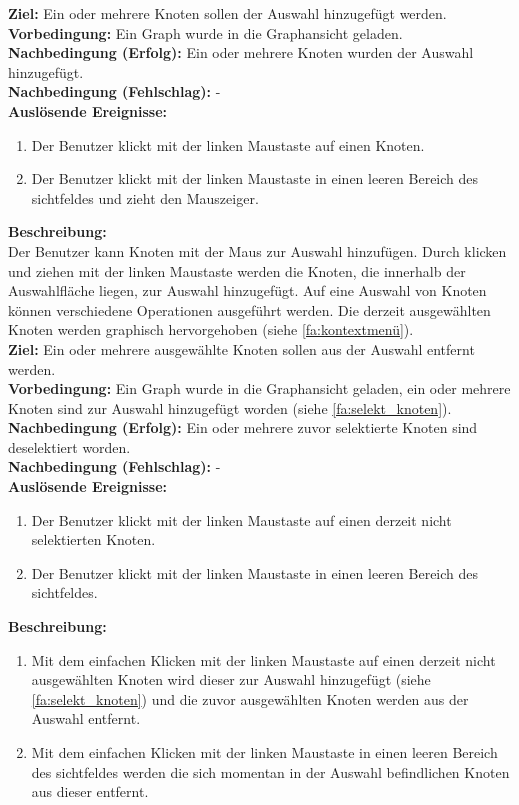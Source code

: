 \label{fa:selekt_knoten}
\textbf{Ziel:} Ein oder mehrere Knoten sollen der Auswahl hinzugefügt werden.\\
\textbf{Vorbedingung:} Ein Graph wurde in die Graphansicht geladen.\\
\textbf{Nachbedingung (Erfolg):} Ein oder mehrere Knoten wurden der Auswahl hinzugefügt.\\
\textbf{Nachbedingung (Fehlschlag):} -\\
\textbf{Auslösende Ereignisse:}
\begin{enumerate}[nolistsep, label=(\alph*)]
  \item Der Benutzer klickt mit der linken Maustaste auf einen Knoten.
  \item Der Benutzer klickt mit der linken Maustaste in einen leeren Bereich des \gls{sichtfeld}es und zieht den Mauszeiger.
\end{enumerate}
\textbf{Beschreibung:}\\
Der Benutzer kann Knoten mit der Maus zur Auswahl hinzufügen. Durch klicken und ziehen mit der linken Maustaste werden die Knoten, die innerhalb der Auswahlfläche liegen, zur Auswahl hinzugefügt.
Auf eine Auswahl von Knoten können verschiedene Operationen ausgeführt werden.
Die derzeit ausgewählten Knoten werden graphisch hervorgehoben (siehe \ref{fa:kontextmenü}).\\

\label{fa:deselekt_knoten}
\textbf{Ziel:} Ein oder mehrere ausgewählte Knoten sollen aus der Auswahl entfernt werden.\\
\textbf{Vorbedingung:} Ein Graph wurde in die Graphansicht geladen, ein oder mehrere Knoten sind zur Auswahl hinzugefügt worden (siehe \ref{fa:selekt_knoten}).\\
\textbf{Nachbedingung (Erfolg):} Ein oder mehrere zuvor selektierte Knoten sind deselektiert worden.\\
\textbf{Nachbedingung (Fehlschlag):} -\\
\textbf{Auslösende Ereignisse:}
\begin{enumerate}[nolistsep, label=(\alph*)]
	\item Der Benutzer klickt mit der linken Maustaste auf einen derzeit nicht selektierten Knoten.
	\item Der Benutzer klickt mit der linken Maustaste in einen leeren Bereich des \gls{sichtfeld}es.
\end{enumerate}
\textbf{Beschreibung:}\\
\begin{enumerate}[nolistsep, label=(\alph*)]
	\item Mit dem einfachen Klicken mit der linken Maustaste auf einen derzeit nicht ausgewählten Knoten wird dieser zur Auswahl hinzugefügt (siehe \ref{fa:selekt_knoten}) und die zuvor ausgewählten Knoten werden aus der Auswahl entfernt. 
	\item Mit dem einfachen Klicken mit der linken Maustaste in einen leeren Bereich des \gls{sichtfeld}es werden die sich momentan in der Auswahl befindlichen Knoten aus dieser entfernt.
\end{enumerate}


